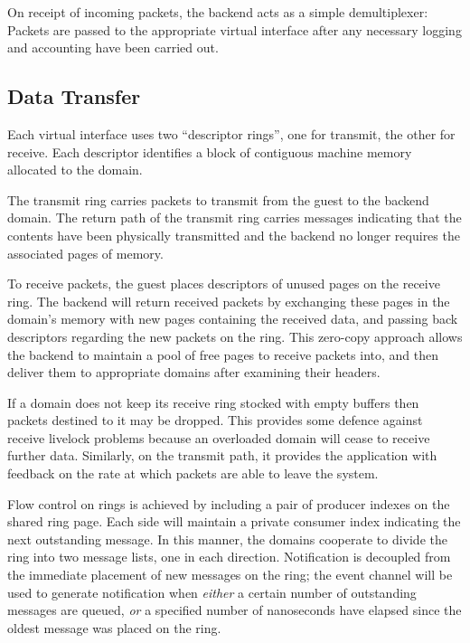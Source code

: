 \documentclass[11pt,twoside,final,openright]{report}
\begin{document}
On receipt of incoming packets, the backend acts as a simple
demultiplexer: Packets are passed to the appropriate virtual interface
after any necessary logging and accounting have been carried out.

\subsection{Data Transfer}

Each virtual interface uses two ``descriptor rings'', one for
transmit, the other for receive.  Each descriptor identifies a block
of contiguous machine memory allocated to the domain.

The transmit ring carries packets to transmit from the guest to the
backend domain.  The return path of the transmit ring carries messages
indicating that the contents have been physically transmitted and the
backend no longer requires the associated pages of memory.

To receive packets, the guest places descriptors of unused pages on
the receive ring.  The backend will return received packets by
exchanging these pages in the domain's memory with new pages
containing the received data, and passing back descriptors regarding
the new packets on the ring.  This zero-copy approach allows the
backend to maintain a pool of free pages to receive packets into, and
then deliver them to appropriate domains after examining their
headers.


If a domain does not keep its receive ring stocked with empty buffers
then packets destined to it may be dropped.  This provides some
defence against receive livelock problems because an overloaded domain
will cease to receive further data.  Similarly, on the transmit path,
it provides the application with feedback on the rate at which packets
are able to leave the system.

Flow control on rings is achieved by including a pair of producer
indexes on the shared ring page.  Each side will maintain a private
consumer index indicating the next outstanding message.  In this
manner, the domains cooperate to divide the ring into two message
lists, one in each direction.  Notification is decoupled from the
immediate placement of new messages on the ring; the event channel
will be used to generate notification when {\em either} a certain
number of outstanding messages are queued, {\em or} a specified number
of nanoseconds have elapsed since the oldest message was placed on the
ring.
\end{document}
